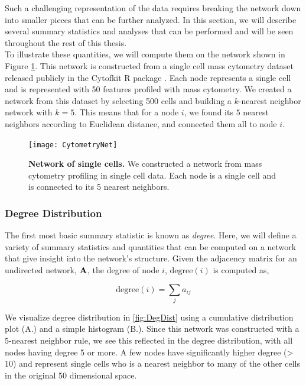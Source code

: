 Such a challenging representation of the data requires breaking the network down into smaller pieces that can be further analyzed. In this section, we will describe several summary statistics and analyses that can be performed and will be seen throughout the rest of this thesis.\\
\indent To illustrate these quantities, we will compute them on the network shown in Figure \ref{fig:Cytometry}. This network is constructed from a single cell mass cytometry dataset released publicly in the Cytofkit R package \cite{cytofkit}. Each node represents a single cell and is represented with 50 features profiled with mass cytometry. We created a network from this dataset by selecting 500 cells and building a $k$-nearest neighbor network with $k=5$. This means that for a node $i$, we found its $5$ nearest neighbors according to Euclidean distance, and connected them all to node $i$. 

\begin{figure}
\begin{center}
\texttt{[image: CytometryNet]}
\caption{{\bf Network of single cells.} We constructed a network from mass cytometry profiling in single cell data. Each node is a single cell and is connected to its 5 nearest neighbors.}
\label{fig:Cytometry}
\end{center}
\end{figure}

\subsubsection{Degree Distribution}

The first most basic summary statistic is known as \emph{degree}. Here, we will define a variety of summary statistics and quantities that can be computed on a network that give insight into the network's structure. Given the adjacency matrix for an undirected network, ${\bf A}$, the degree of node $i$, $\text{degree}(i)$ is computed as,

\begin{equation}
\text{degree}(i)=\sum_{j}a_{ij}
\end{equation}

We visualize degree distribution in \ref{fig:DegDist} using a cumulative distribution plot (A.) and a simple histogram (B.). Since this network was constructed with a $5$-nearest neighbor rule, we see this reflected in the degree distribution, with all nodes having degree 5 or more. A few nodes have significantly higher degree (> 10) and represent single cells who is a nearest neighbor to many of the other cells in the original 50 dimensional space. 

